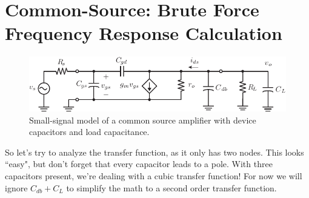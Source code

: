 \section{Common-Source:  Brute Force Frequency Response Calculation}
\begin{figure}[tb]
\begin{center}
\includegraphics[scale=1]{cs_amp_ac_caps}
\end{center}
\caption{Small-signal model of a common source amplifier with device capacitors and load capacitance.} \label{fig:cs_amp_ac_caps}
\end{figure}

So let's try to analyze the transfer function, as it only has two nodes.  This looks ``easy", but don't forget that every capacitor leads to a pole.  With three capacitors present, we're dealing with a cubic transfer function! For now we will ignore $C_{db}+C_L$ to simplify the math to a second order transfer function.  

